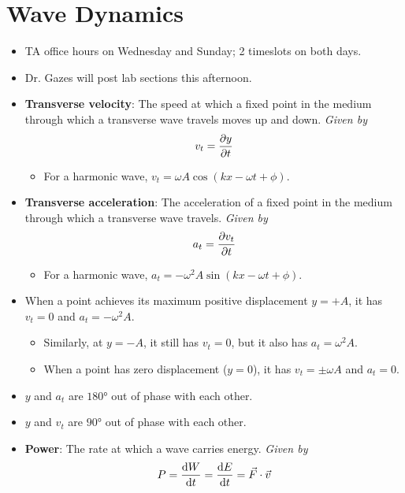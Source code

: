 \documentclass[../notes.tex]{subfiles}
\begin{document}
\section{Wave Dynamics}
\begin{itemize}
    \item {}TA office hours on Wednesday and Sunday; 2 timeslots on both days.
    \item Dr. Gazes will post lab sections this afternoon.
    \item \textbf{Transverse velocity}: The speed at which a fixed point in the medium through which a transverse wave travels moves up and down. \emph{Given by}
    \begin{align*}
        v_t = \pdv{y}{t}
    \end{align*}
    \begin{itemize}
        \item For a harmonic wave, $v_t=\omega A\cos(kx-\omega t+\phi)$.
    \end{itemize}
    \item \textbf{Transverse acceleration}: The acceleration of a fixed point in the medium through which a transverse wave travels. \emph{Given by}
    \begin{align*}
        a_t = \pdv{v_t}{t}
    \end{align*}
    \begin{itemize}
        \item For a harmonic wave, $a_t=-\omega^2A\sin(kx-\omega t+\phi)$.
    \end{itemize}
    \item When a point achieves its maximum positive displacement $y=+A$, it has $v_t=0$ and $a_t=-\omega^2A$.
    \begin{itemize}
        \item Similarly, at $y=-A$, it still has $v_t=0$, but it also has $a_t=\omega^2A$.
        \item When a point has zero displacement ($y=0$), it has $v_t=\pm\omega A$ and $a_t=0$.
    \end{itemize}
    \item $y$ and $a_t$ are $\ang{180}$ out of phase with each other.
    \item $y$ and $v_t$ are $\ang{90}$ out of phase with each other.
    \item \textbf{Power}: The rate at which a wave carries energy. \emph{Given by}
    \begin{equation*}
        P = \dv{W}{t}
        = \dv{E}{t}
        = \vec{F}\cdot\vec{v}

\end{equation*}
\end{itemize}
\end{document}
